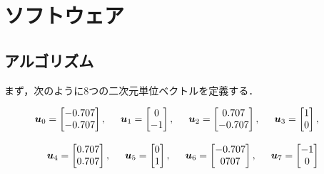 \documentclass[11pt,a4paper]{jsarticle}
\begin{document}
\section{ソフトウェア} 

\subsection{アルゴリズム}

  まず，次のように8つの二次元単位ベクトルを定義する．

  \begin{eqnarray}
    \bm{u}_0 = \begin{bmatrix} -0.707 \\ -0.707 \end{bmatrix}, \hspace{5mm} \nonumber
    \bm{u}_1 = \begin{bmatrix}  0     \\ -1     \end{bmatrix}, \hspace{5mm}
    \bm{u}_2 = \begin{bmatrix}  0.707 \\ -0.707 \end{bmatrix}, \hspace{5mm}
    \bm{u}_3 = \begin{bmatrix}  1     \\  0     \end{bmatrix}, \hspace{5mm} \\[3mm]
    \bm{u}_4 = \begin{bmatrix}  0.707 \\  0.707 \end{bmatrix}, \hspace{5mm} \nonumber
    \bm{u}_5 = \begin{bmatrix}  0     \\  1     \end{bmatrix}, \hspace{5mm}
    \bm{u}_6 = \begin{bmatrix} -0.707 \\  0707  \end{bmatrix}, \hspace{5mm}
    \bm{u}_7 = \begin{bmatrix} -1     \\  0     \end{bmatrix}  \hspace{5mm} \\ \nonumber
  \end{eqnarray}
\end{document}

